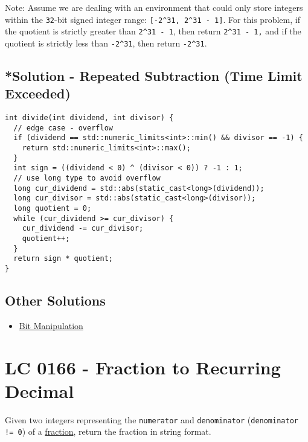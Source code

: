 Note: Assume we are dealing with an environment that could only store integers within the {\colorbox{CodeBackground}{\lstinline|32|}}-bit signed integer range:  {\colorbox{CodeBackground}{\lstinline|[-2^31, 2^31 - 1]|}}.  For this problem, if the quotient is strictly greater than {\colorbox{CodeBackground}{\lstinline|2^31 - 1|}}, then return {\colorbox{CodeBackground}{\lstinline|2^31 - 1,|}} and if the quotient is strictly less than {\colorbox{CodeBackground}{\lstinline|-2^31|}}, then return {\colorbox{CodeBackground}{\lstinline|-2^31|}}.

\subsection*{*Solution - Repeated Subtraction (Time Limit Exceeded)}\label{solution:lc0029_repeated_substraction}
\begin{lstlisting}
int divide(int dividend, int divisor) {
  // edge case - overflow
  if (dividend == std::numeric_limits<int>::min() && divisor == -1) {
    return std::numeric_limits<int>::max();
  }
  int sign = ((dividend < 0) ^ (divisor < 0)) ? -1 : 1;
  // use long type to avoid overflow
  long cur_dividend = std::abs(static_cast<long>(dividend));
  long cur_divisor = std::abs(static_cast<long>(divisor));
  long quotient = 0;
  while (cur_dividend >= cur_divisor) {
    cur_dividend -= cur_divisor;
    quotient++;
  }
  return sign * quotient;
}
\end{lstlisting}

\subsection*{Other Solutions}
\begin{itemize}
\item \hyperref[solution:lc0029_bit_manipulation]{Bit Manipulation}
\end{itemize}

\section{LC 0166 - Fraction to Recurring Decimal}
Given two integers representing the {\colorbox{CodeBackground}{\lstinline|numerator|}} and {\colorbox{CodeBackground}{\lstinline|denominator|}} ({\colorbox{CodeBackground}{\lstinline|denominator != 0|}}) of a \ul{fraction}, return the fraction in string format.\\


